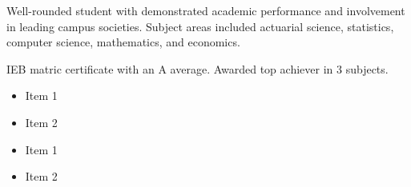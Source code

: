 \documentclass[10pt,a4paper,ragged2e,withhyper]{altacv}
\begin{document}
\begin{paracol}{2}
	    Well-rounded student with demonstrated academic performance and involvement in leading campus societies. Subject areas included actuarial science, statistics, computer science, mathematics, and economics.

            \divider

	      IEB matric certificate with an A average. Awarded top achiever in 3 subjects.
        
            \begin{itemize}
                \item Item 1
                \item Item 2
            \end{itemize}
            \divider
            
            \begin{itemize}
                \item Item 1
                \item Item 2
            \end{itemize}
    \end{paracol}
\end{document}
